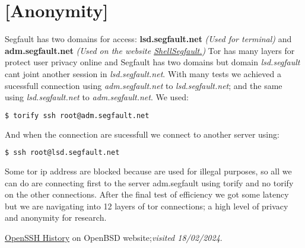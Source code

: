 \documentclass[english,12pt,a4paper,twoside,openright,openany,onecolumn,titlepage,openbib,leqno,fleqn]{article}
\begin{document}
	\section{[Anonymity]}
	\raggedright
	\textnormal{Segfault has two domains for access: \textbf{lsd.segfault.net} \emph{(Used for terminal)} and \textbf{adm.segfault.net} \emph{(Used on the website \href{https://shell.segfault.net}{ShellSegfault.})}}
    \newline\newline 
    \textnormal{Tor has many layers for protect user privacy online and Segfault has two domains but domain \textit{lsd.segfault} cant joint another session in \textit{lsd.segfault.net}. With many tests we achieved a sucessfull connection using \textit{adm.segfault.net} to \textit{lsd.segfault.net}; and the same using \textit{lsd.segfault.net} to \textit{adm.segfault.net}.
    \newline\newline
    We used:}
    \newline 
    \begin{lstlisting}[language=bash]
        $ torify ssh root@adm.segfault.net
    \end{lstlisting}
    \textnormal{And when the connection are sucessfull we connect to another server using:}
    \begin{lstlisting}[language=bash]
        $ ssh root@lsd.segfault.net
    \end{lstlisting} 
	\textnormal{Some tor ip address are blocked because are used for illegal purposes, so all we can do are connecting first to the server adm.segfault using torify and no torify on the other connections.
    \newline\newline
	After the final test of efficiency we got some latency but we are navigating into 12 layers of tor connections; a high level of privacy and anonymity for research.}
	
	\begin{thebibliography}{9}
	\href{https://www.openssh.com/history.html}{OpenSSH History} \textnormal{on OpenBSD website;}\emph{visited 18/02/2024}.
	\end{thebibliography}
\end{document}
